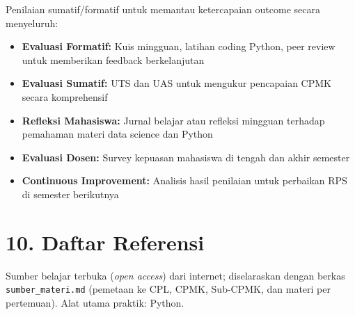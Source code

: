 \documentclass[12pt,a4paper]{article}
\begin{document}
Penilaian sumatif/formatif untuk memantau ketercapaian outcome secara menyeluruh:

\begin{itemize}[leftmargin=*]
  \item \textbf{Evaluasi Formatif:} Kuis mingguan, latihan coding Python, peer review untuk memberikan feedback berkelanjutan
  \item \textbf{Evaluasi Sumatif:} UTS dan UAS untuk mengukur pencapaian CPMK secara komprehensif
  \item \textbf{Refleksi Mahasiswa:} Jurnal belajar atau refleksi mingguan terhadap pemahaman materi data science dan Python
  \item \textbf{Evaluasi Dosen:} Survey kepuasan mahasiswa di tengah dan akhir semester
  \item \textbf{Continuous Improvement:} Analisis hasil penilaian untuk perbaikan RPS di semester berikutnya
\end{itemize}

\vspace{0.5cm}

\section*{10. Daftar Referensi}

Sumber belajar terbuka (\textit{open access}) dari internet; diselaraskan dengan berkas \texttt{sumber\_materi.md} (pemetaan ke CPL, CPMK, Sub-CPMK, dan materi per pertemuan). Alat utama praktik: Python.
\end{document}
